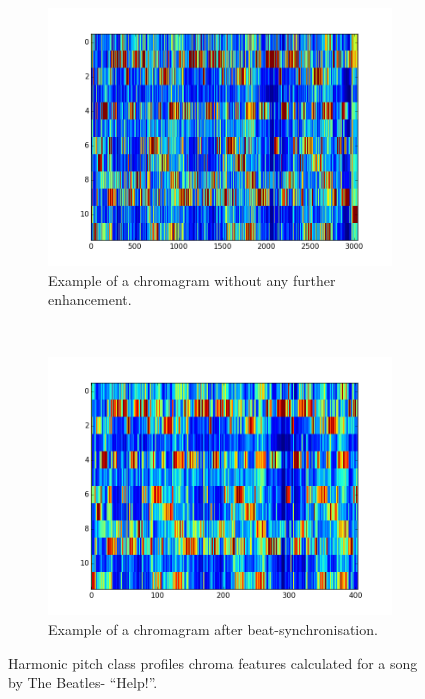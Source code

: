 \begin{figure}
        \centering
        \begin{subfigure}[b]{0.47\textwidth}
                \includegraphics[width=\textwidth]{Figures/hpcp_unsynched_chroma}
                \caption{Example of a chromagram without any further enhancement. }
                \label{fig:unchroma}
        \end{subfigure}%
        ~ %
        \begin{subfigure}[b]{0.47\textwidth}
                \includegraphics[width=\textwidth]{Figures/hpcp_synched_chroma}
                \caption{Example of a chromagram after beat-synchronisation.}
                \label{fig:synchroma}
        \end{subfigure}
          \caption{Harmonic pitch class profiles chroma features calculated for a song by The Beatles- ``Help!''.}
        \label{fig:chromacomparison}
\end{figure}

